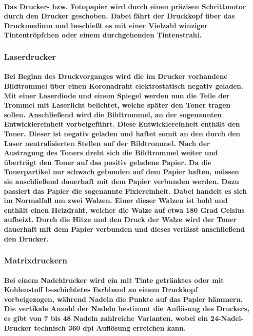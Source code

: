 \documentclass[a4paper]{article}
\begin{document}
    \paragraph{\color{codegreen}Das Drucker- bzw. Fotopapier  wird durch einen präzisen Schrittmotor durch den Drucker geschoben. Dabei fährt der Druckkopf über das Druckmedium und beschießt es mit einer Vielzahl winziger Tintentröpfchen oder einem durchgehenden Tintenstrahl.}
    \subsubsection{\color{codegreen}Laserdrucker}
    \paragraph{\color{codegreen}Bei Beginn des Druckvorganges wird die im Drucker vorhandene Bildtrommel über einen Koronadraht elektrostatisch negativ geladen. Mit einer Laserdiode und einem Spiegel werden nun die Teile der Trommel mit Laserlicht belichtet, welche später den Toner tragen sollen. Anschließend wird die Bildtrommel, an der sogenannten Entwicklereinheit vorbeigeführt. Diese Entwicklereinheit enthält den Toner. Dieser ist negativ geladen und haftet somit an den durch den Laser neutralisierten Stellen auf der Bildtrommel. Nach der Austragung des Toners dreht sich die Bildtrommel weiter und überträgt den Toner auf das positiv geladene Papier. Da die Tonerpartikel nur schwach gebunden auf dem Papier haften, müssen sie anschließend dauerhaft mit dem Papier verbunden werden. Dazu passiert das Papier die sogenannte Fixiereinheit. Dabei handelt es sich im Normalfall um zwei Walzen. Einer dieser Walzen ist hohl und enthält einen Heizdraht, welcher die Walze auf etwa 180 Grad Celsius aufheizt. Durch die Hitze und den Druck der Walze wird der Toner dauerhaft mit dem Papier verbunden und dieses verlässt anschließend den Drucker.}
    \subsubsection{\color{codegreen}Matrixdruckern}
    \paragraph{\color{codegreen} Bei einem Nadeldrucker wird ein mit Tinte getränktes oder mit Kohlenstoff beschichtetes Farbband an einem Druckkopf vorbeigezogen, während Nadeln die Punkte auf das Papier hämmern. Die vertikale Anzahl der Nadeln bestimmt die Auflösung des Druckers, es gibt von 7 bis 48 Nadeln zahlreiche Varianten, wobei ein 24-Nadel-Drucker technisch 360 dpi Auflösung erreichen kann.}
    
\end{document}
